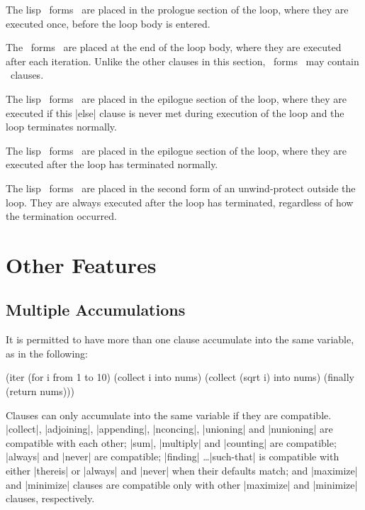 \begin{clauses}

The lisp ~forms~ are placed in the prologue section of the loop, where
they are executed once, before the loop body is entered.

The ~forms~ are placed at the end of the loop body, where they
are executed after each iteration.  Unlike the other clauses in this
section, ~forms~ may contain \iter\ clauses.

The lisp ~forms~ are placed in the epilogue section of the loop, where they
are executed if this |else| clause is never met during execution of the
loop and the loop terminates normally.

The lisp ~forms~ are placed in the epilogue section of the loop, where
they are executed after the loop has terminated normally.

The lisp ~forms~ are placed in the second form of an unwind-protect
outside the loop.  They are always executed after the loop has
terminated, regardless of how the termination occurred.

\end{clauses}


\section{Other Features}

\subsection{Multiple Accumulations}
\label{multiple}

\begin{sloppypar}
It is permitted to have more than one clause accumulate into the same
variable, as in the following:
\begin{program}
(iter (for i from 1 to 10)
      (collect i into nums)
      (collect (sqrt i) into nums)
      (finally (return nums)))
\end{program}
Clauses can only accumulate into the same variable if they are
compatible.  |collect|, |adjoining|, |appending|, |nconcing|,
|unioning| and |nunioning| are compatible with each other; |sum|,
|multiply| and |counting| are compatible; |always| and |never| are compatible;
|finding| \dots |such-that| is compatible with either |thereis| or |always|
and |never| when their defaults match; and |maximize| and |minimize| clauses
are compatible only with other |maximize| and |minimize| clauses,
respectively.

\end{sloppypar}

